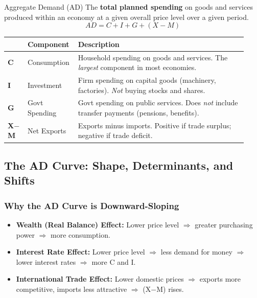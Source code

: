 \documentclass[11pt, a4paper, twoside]{book}
\begin{document}
\begin{keyterm}{Aggregate Demand (AD)}
The \textbf{total planned spending} on goods and services produced within an economy at a given overall price level over a given period.
\[
AD = C + I + G + (X - M)
\]
\end{keyterm}

\begin{tcolorbox}[enhanced,colback=LightBlue,colframe=MidBlue!70,arc=0pt,boxrule=0.8pt]
\begin{tabular}{@{}>{\RaggedRight\arraybackslash}p{0.08\linewidth}>{\RaggedRight\arraybackslash}p{0.17\linewidth}>{\RaggedRight\arraybackslash}p{0.68\linewidth}@{}}
\textbf{\color{NavyPrimary}} & \textbf{\color{NavyPrimary}Component} & \textbf{\color{NavyPrimary}Description} \\
\midrule
\textbf{C} & Consumption & Household spending on goods and services. The \emph{largest} component in most economies. \\
\textbf{I} & Investment & Firm spending on capital goods (machinery, factories). \emph{Not} buying stocks and shares. \\
\textbf{G} & Govt Spending & Govt spending on public services. Does \emph{not} include transfer payments (pensions, benefits). \\
\textbf{X$-$M} & Net Exports & Exports minus imports. Positive if trade surplus; negative if trade deficit. \\
\end{tabular}
\end{tcolorbox}

\subsection{The AD Curve: Shape, Determinants, and Shifts}

\subsubsection{Why the AD Curve is Downward-Sloping}

\begin{itemize}
  \item \textbf{Wealth (Real Balance) Effect:} Lower price level $\Rightarrow$ greater purchasing power $\Rightarrow$ more consumption.
  \item \textbf{Interest Rate Effect:} Lower price level $\Rightarrow$ less demand for money $\Rightarrow$ lower interest rates $\Rightarrow$ more C and I.
  \item \textbf{International Trade Effect:} Lower domestic prices $\Rightarrow$ exports more competitive, imports less attractive $\Rightarrow$ (X$-$M) rises.
\end{itemize}
\end{document}
